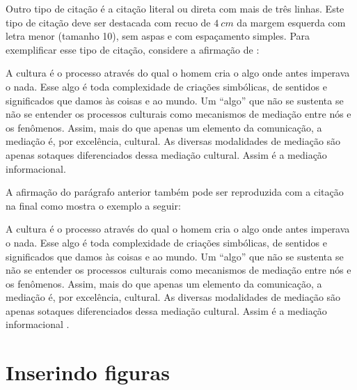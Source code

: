        Outro tipo de citação é a citação literal ou direta com mais de três linhas. Este tipo de citação deve ser destacada com recuo de $4~cm$ da margem esquerda com letra menor (tamanho 10), sem aspas e com espaçamento simples.  Para exemplificar esse tipo de citação, considere a afirmação de :
        
        \begin{citacao}
            A cultura é o processo através do qual o homem cria o algo onde antes imperava o
            nada. Esse algo é toda complexidade de criações simbólicas, de sentidos e significados que
            damos às coisas e ao mundo. Um “algo” que não se sustenta se não se entender os processos
            culturais como mecanismos de mediação entre nós e os fenômenos. Assim, mais do que
            apenas um elemento da comunicação, a mediação é, por excelência, cultural. As diversas
            modalidades de mediação são apenas sotaques diferenciados dessa mediação cultural. Assim
            é a mediação informacional.
        \end{citacao}
        
        A afirmação do parágrafo anterior também pode ser reproduzida com a citação na final como mostra o exemplo a seguir: 
        
        \begin{citacao}
            A cultura é o processo através do qual o homem cria o algo onde antes imperava o
            nada. Esse algo é toda complexidade de criações simbólicas, de sentidos e significados que
            damos às coisas e ao mundo. Um “algo” que não se sustenta se não se entender os processos
            culturais como mecanismos de mediação entre nós e os fenômenos. Assim, mais do que
            apenas um elemento da comunicação, a mediação é, por excelência, cultural. As diversas
            modalidades de mediação são apenas sotaques diferenciados dessa mediação cultural. Assim
            é a mediação informacional \cite{feitosa2016}.
        \end{citacao}
        
        
        
        

    \section{Inserindo figuras}
    \label{sec:figuras}
    
